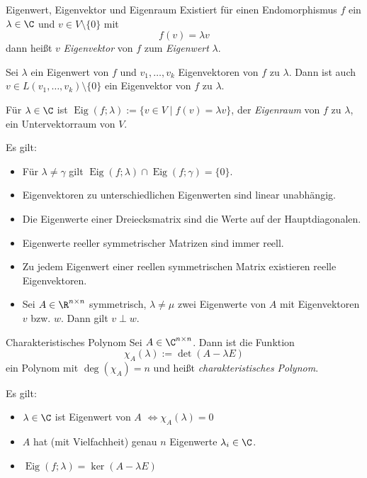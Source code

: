 \documentclass[german]{../spicker}
\newcommand{\Eig}{\operatorname{Eig}}
\begin{document}
\begin{defi}{Eigenwert, Eigenvektor und Eigenraum}
    Existiert für einen Endomorphismus $f$ ein $\lambda \in \C$ und $v\in V \setminus \{0\}$ mit
    $$
        f(v) = \lambda v
    $$
    dann heißt $v$ \emph{Eigenvektor} von $f$ zum \emph{Eigenwert} $\lambda$.

    Sei $\lambda$ ein Eigenwert von $f$ und $v_1, \ldots, v_k$ Eigenvektoren von $f$ zu $\lambda$.
    Dann ist auch $v \in L(v_1, \ldots, v_k) \setminus \{0\}$ ein Eigenvektor von $f$ zu $\lambda$.

    Für $\lambda \in \C$ ist $\Eig(f;\lambda) := \{v \in V \mid f(v) = \lambda v\}$, der \emph{Eigenraum} von $f$ zu $\lambda$, ein Untervektorraum von $V$.

    Es gilt:
    \begin{itemize}
        \item Für $\lambda \neq \gamma$ gilt $\Eig(f;\lambda) \cap \Eig(f;\gamma) = \{0\}$.
        \item Eigenvektoren zu unterschiedlichen Eigenwerten sind linear unabhängig.
        \item Die Eigenwerte einer Dreiecksmatrix sind die Werte auf der Hauptdiagonalen.
        \item Eigenwerte reeller symmetrischer Matrizen sind immer reell.
        \item Zu jedem Eigenwert einer reellen symmetrischen Matrix existieren reelle Eigenvektoren.
        \item Sei $A \in \R^{n\times n}$ symmetrisch, $\lambda \neq \mu$ zwei Eigenwerte von $A$ mit Eigenvektoren $v$ bzw. $w$. Dann gilt $v \perp w$.
    \end{itemize}

\end{defi}

\begin{defi}{Charakteristisches Polynom}
    Sei $A \in \C^{n\times n}$.
    Dann ist die Funktion
    $$
        \chi_A(\lambda) := \det(A-\lambda E)
    $$
    ein Polynom mit $\deg(\chi_A) = n$ und heißt \emph{charakteristisches Polynom}.

    Es gilt:
    \begin{itemize}
        \item $\lambda \in \C$ ist Eigenwert von $A$ $\iff \chi_A(\lambda) = 0$
        \item $A$ hat (mit Vielfachheit) genau $n$ Eigenwerte $\lambda_i \in \C$.
        \item $\Eig(f;\lambda) = \ker(A-\lambda E)$
    \end{itemize}
\end{defi}
\end{document}
